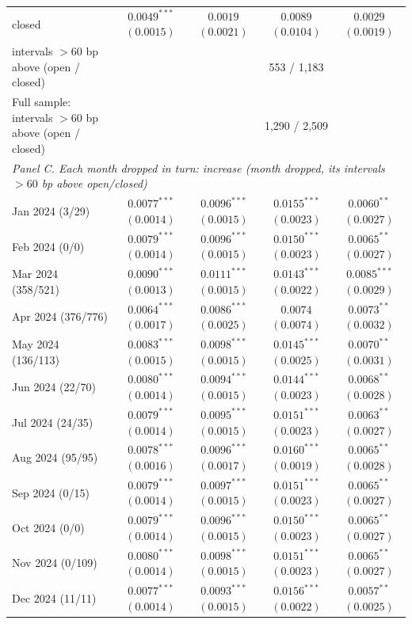 \begin{tabular}{lcccc}
\quad closed & $0.0049^{***}$ $(0.0015)$ & $0.0019$ $(0.0021)$ & $0.0089$ $(0.0104)$ & $0.0029$ $(0.0019)$ \\
\quad intervals $>60$ bp above (open / closed) & & \multicolumn{3}{c}{553 / 1,183} \\
Full sample: intervals $>60$ bp above (open / closed) & & \multicolumn{3}{c}{1,290 / 2,509} \\
\midrule
\multicolumn{5}{l}{\emph{Panel C. Each month dropped in turn: increase (month dropped, its intervals $>60$ bp above open/closed)}} \\
Jan 2024 (3/29) & $0.0077^{***}$ $(0.0014)$ & $0.0096^{***}$ $(0.0015)$ & $0.0155^{***}$ $(0.0023)$ & $0.0060^{**}$ $(0.0027)$ \\
Feb 2024 (0/0) & $0.0079^{***}$ $(0.0014)$ & $0.0096^{***}$ $(0.0015)$ & $0.0150^{***}$ $(0.0023)$ & $0.0065^{**}$ $(0.0027)$ \\
Mar 2024 (358/521) & $0.0090^{***}$ $(0.0013)$ & $0.0111^{***}$ $(0.0015)$ & $0.0143^{***}$ $(0.0022)$ & $0.0085^{***}$ $(0.0029)$ \\
Apr 2024 (376/776) & $0.0064^{***}$ $(0.0017)$ & $0.0086^{***}$ $(0.0025)$ & $0.0074$ $(0.0074)$ & $0.0073^{**}$ $(0.0032)$ \\
May 2024 (136/113) & $0.0083^{***}$ $(0.0015)$ & $0.0098^{***}$ $(0.0015)$ & $0.0145^{***}$ $(0.0025)$ & $0.0070^{**}$ $(0.0031)$ \\
Jun 2024 (22/70) & $0.0080^{***}$ $(0.0014)$ & $0.0094^{***}$ $(0.0015)$ & $0.0144^{***}$ $(0.0023)$ & $0.0068^{**}$ $(0.0028)$ \\
Jul 2024 (24/35) & $0.0079^{***}$ $(0.0014)$ & $0.0095^{***}$ $(0.0015)$ & $0.0151^{***}$ $(0.0023)$ & $0.0063^{**}$ $(0.0027)$ \\
Aug 2024 (95/95) & $0.0078^{***}$ $(0.0016)$ & $0.0096^{***}$ $(0.0017)$ & $0.0160^{***}$ $(0.0019)$ & $0.0065^{**}$ $(0.0028)$ \\
Sep 2024 (0/15) & $0.0079^{***}$ $(0.0014)$ & $0.0097^{***}$ $(0.0015)$ & $0.0151^{***}$ $(0.0023)$ & $0.0065^{**}$ $(0.0027)$ \\
Oct 2024 (0/0) & $0.0079^{***}$ $(0.0014)$ & $0.0096^{***}$ $(0.0015)$ & $0.0150^{***}$ $(0.0023)$ & $0.0065^{**}$ $(0.0027)$ \\
Nov 2024 (0/109) & $0.0080^{***}$ $(0.0014)$ & $0.0098^{***}$ $(0.0015)$ & $0.0151^{***}$ $(0.0023)$ & $0.0065^{**}$ $(0.0027)$ \\
Dec 2024 (11/11) & $0.0077^{***}$ $(0.0014)$ & $0.0093^{***}$ $(0.0015)$ & $0.0156^{***}$ $(0.0022)$ & $0.0057^{**}$ $(0.0025)$ \\

\end{tabular}
